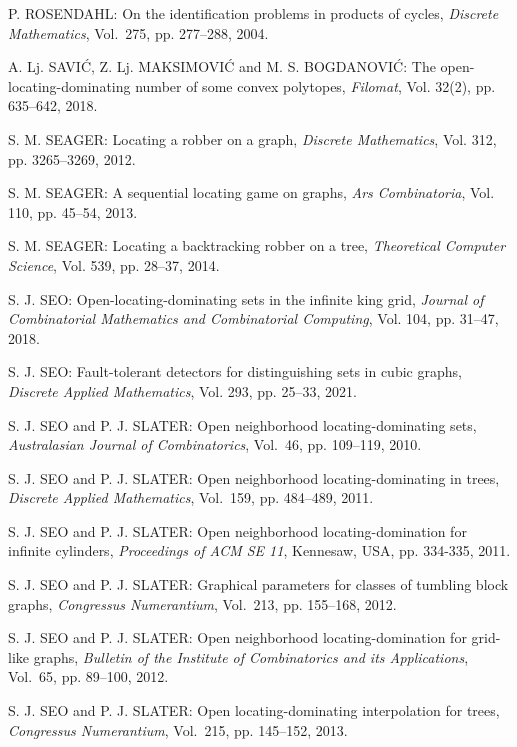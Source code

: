 \begin{thebibliography}{999}
P. ROSENDAHL: On the identification problems in products of cycles, {\it Discrete Mathematics}, Vol.~275, pp. 277--288, 2004.

A. Lj. SAVI\'C, Z. Lj. MAKSIMOVI\'C and M. S. BOGDANOVI\'C: The open-locating-dominating number of some convex polytopes, {\it Filomat}, Vol. 32(2), pp. 635--642, 2018.

S. M. SEAGER: Locating a robber on a graph, {\it Discrete Mathematics}, Vol. 312, pp. 3265--3269, 2012.

S. M. SEAGER: A sequential locating game on graphs, {\it Ars Combinatoria}, Vol. 110, pp. 45--54, 2013.

S. M. SEAGER: Locating a backtracking robber on a tree, {\it Theoretical Computer Science}, Vol. 539, pp. 28--37, 2014.

S. J. SEO: Open-locating-dominating sets in the infinite king grid, {\it Journal of Combinatorial Mathematics and Combinatorial Computing}, Vol. 104, pp. 31--47, 2018.

S. J. SEO: Fault-tolerant detectors for distinguishing sets in cubic graphs, {\it Discrete Applied Mathematics}, Vol. 293, pp. 25--33, 2021.

S. J. SEO and P. J. SLATER: Open neighborhood locating-dominating sets, {\it Australasian Journal of Combinatorics}, Vol.~46, pp. 109--119, 2010.

S. J. SEO and P. J. SLATER: Open neighborhood locating-dominating in trees, {\it Discrete Applied Mathematics}, Vol.~159, pp. 484--489, 2011. 

S. J. SEO and P. J. SLATER: Open neighborhood locating-domination for infinite cylinders, {\it Proceedings of ACM SE 11}, Kennesaw, USA, pp. 334-335, 2011.

S. J. SEO and P. J. SLATER: Graphical parameters for classes of tumbling block graphs, {\it Congressus Numerantium}, Vol.~213, pp. 155--168, 2012.

S. J. SEO and P. J. SLATER: Open neighborhood locating-domination for grid-like graphs, {\it Bulletin of the Institute of Combinatorics and its Applications}, Vol.~65, pp. 89--100, 2012.

S. J. SEO and P. J. SLATER: Open locating-dominating interpolation for trees, {\it Congressus Numerantium}, Vol.~215, pp. 145--152, 2013.


\end{thebibliography}
